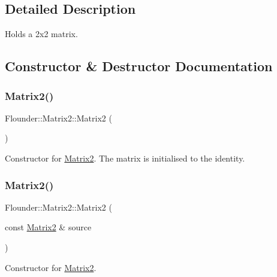 \subsection{Detailed Description}
Holds a 2x2 matrix. 



\subsection{Constructor \& Destructor Documentation}
\mbox{\label{class_flounder_1_1_matrix2_af851e255718e0cb7ed8ecb49f2b1a814}} 
\subsubsection{\texorpdfstring{Matrix2()}{Matrix2()}\hspace{0.1cm}{\footnotesize\ttfamily [1/3]}}
{\footnotesize\ttfamily Flounder\+::\+Matrix2\+::\+Matrix2 (\begin{DoxyParamCaption}{ }\end{DoxyParamCaption})}



Constructor for \hyperlink{class_flounder_1_1_matrix2}{Matrix2}. The matrix is initialised to the identity. 

\mbox{\label{class_flounder_1_1_matrix2_a17d61a8514344b7e29c1090275a6b3aa}} 
\subsubsection{\texorpdfstring{Matrix2()}{Matrix2()}\hspace{0.1cm}{\footnotesize\ttfamily [2/3]}}
{\footnotesize\ttfamily Flounder\+::\+Matrix2\+::\+Matrix2 (\begin{DoxyParamCaption}\item[{const \hyperlink{class_flounder_1_1_matrix2}{Matrix2} \&}]{source }\end{DoxyParamCaption})}



Constructor for \hyperlink{class_flounder_1_1_matrix2}{Matrix2}. 


